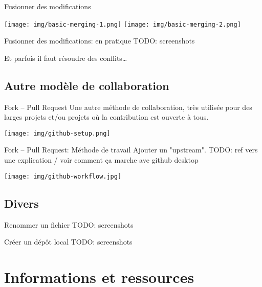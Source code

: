\documentclass{beamer}
\begin{document}
\begin{frame}{Fusionner des modifications}
\begin{center}
    \texttt{[image: img/basic-merging-1.png]}
    \texttt{[image: img/basic-merging-2.png]}
\end{center}
\end{frame}

\begin{frame}{Fusionner des modifications: en pratique}
    TODO: screenshots

    Et parfois il faut résoudre des conflits\dots
\end{frame}


\subsection{Autre modèle de collaboration}

\begin{frame}{Fork -- Pull Request}
    Une autre méthode de collaboration, très utilisée pour des larges projets
    et/ou projets o\`u la contribution est ouverte à tous.
    \begin{center}
        \texttt{[image: img/github-setup.png]}
    \end{center}
\end{frame}

\begin{frame}{Fork -- Pull Request: Méthode de travail}
    Ajouter un "upstream". TODO: ref vers une explication / voir comment ça marche ave github desktop
    \begin{center}
        \texttt{[image: img/github-workflow.jpg]}
    \end{center}
\end{frame}

\subsection{Divers}

\begin{frame}{Renommer un fichier}
    TODO: screenshots
\end{frame}

\begin{frame}{Créer un dépôt local}
    TODO: screenshots
\end{frame}

\section{Informations et ressources}
\end{document}
